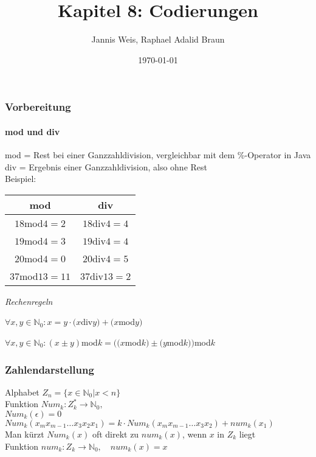 \documentclass{beamer}
\title{Kapitel 8: Codierungen}
\author{Jannis Weis, Raphael Adalid Braun}
\date{\today}
\institute{KIT - Karlruher Institut für Technologie}
\begin{document}
	\begin{frame}
		\titlepage
	\end{frame}
	\begin{frame}
		\frametitle{Vorbereitung}
		\framesubtitle{mod und div}
		mod = Rest bei einer Ganzzahldivision, vergleichbar mit dem \%-Operator in Java\\
		div = Ergebnis einer Ganzzahldivision, also ohne Rest\\
		Beispiel:\\
		\center
		\begin{tabular}{c|c}
			\textbf{mod} & \textbf{div}\\
			\hline
			$18$mod$4=2$ & $18$div$4=4$\\
			$19$mod$4=3$ & $19$div$4=4$\\
			$20$mod$4=0$ & $20$div$4=5$\\
			$37$mod$13=11$ & $37$div$13=2$\\
		\end{tabular}
		\flushleft
		\emph{Rechenregeln}\\
		\small
		\centerline{$\forall x,y\in\mathbb{N}_{0}:x=y\cdot(x$div$y)+(x$mod$y)$}
		\centerline{$\forall x,y\in\mathbb{N}_{0}:(x\pm y)$mod$k=((x$mod$k)\pm(y$mod$k))$mod$k$}
		\normalsize
	\end{frame}
	\begin{frame}
		\frametitle{Zahlendarstellung}
		Alphabet $Z_{n}=\{x\in\mathbb{N}_{0}\vert x<n\}$\\
		Funktion $Num_{k}: Z_{k}^{\ast}\longrightarrow\mathbb{N}_{0},$\\
		\small
		$Num_{k}(\epsilon)=0$\\
		$Num_{k}(x_{m}x_{m-1}\dots x_{3}x_{2}x_{1})=k\cdot Num_{k}(x_{m}x_{m-1}\dots x_{3}x_{2})+num_{k}(x_{1})$\\
		Man kürzt $Num_{k}(x)$ oft direkt zu $num_{k}(x)$, wenn $x$ in $Z_{k}$ liegt\\
		\normalsize
		Funktion $num_{k}: Z_{k}\longrightarrow\mathbb{N}_{0},$\small$\quad num_{k}(x)=x$\normalsize\\
	\end{frame}
\end{document}
